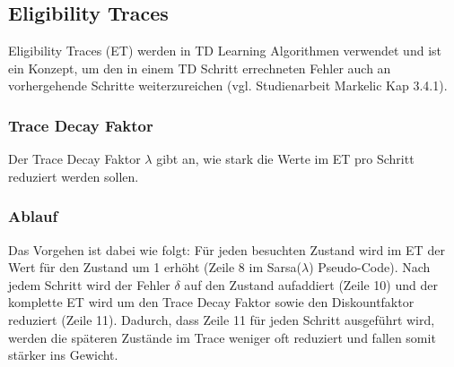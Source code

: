 \documentclass[10pt]{scrartcl}
\begin{document}

\subsection{Eligibility Traces}
Eligibility Traces (ET) werden in TD Learning Algorithmen verwendet und ist ein Konzept, um den in einem TD
Schritt errechneten Fehler auch an vorhergehende Schritte weiterzureichen (vgl. Studienarbeit
Markelic Kap 3.4.1).

\subsubsection{Trace Decay Faktor}
Der Trace Decay Faktor $\lambda$ gibt an, wie stark die Werte im ET pro Schritt reduziert werden sollen.

\subsubsection{Ablauf}
Das Vorgehen ist dabei wie folgt: Für jeden besuchten Zustand wird im ET der Wert für den Zustand um 1 erhöht (Zeile 8 im Sarsa($\lambda$) Pseudo-Code). Nach jedem Schritt wird der Fehler $\delta$ auf den Zustand aufaddiert (Zeile 10) und der komplette ET wird um den Trace Decay Faktor sowie den Diskountfaktor reduziert (Zeile 11).
Dadurch, dass Zeile 11 für jeden Schritt ausgeführt wird, werden die späteren Zustände im Trace weniger oft reduziert und fallen somit stärker ins Gewicht. 
\end{document}
